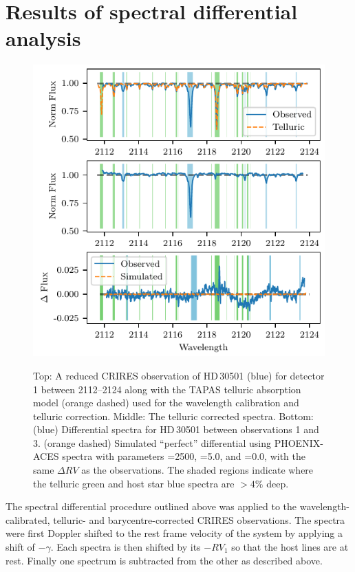 

\section{Results of spectral differential analysis}
\label{subsec:differential_results}

\begin{figure}
    \centering
    \includegraphics[width=0.8\hsize]{figures/direct-recovery/differential.pdf}\\
    \caption[Example of the spectral differential technique.]{Top: A reduced {CRIRES} observation of {HD\,30501} (blue) for detector 1 between 2112--2124\nm{} along with the {TAPAS} telluric absorption model ({orange} dashed) used for the wavelength calibration and telluric correction.
        Middle: The telluric corrected spectra.
        Bottom: ({blue}) Differential spectra for {HD\,30501} between observations 1 and 3.
        ({orange} dashed) Simulated ``perfect'' differential using {PHOENIX-ACES} spectra with parameters \Teff{}=2500\K{}, \Logg{}=5.0, and \feh{}=0.0, with the same \(\Delta {RV}\) as the observations.
        The shaded regions indicate where the telluric {green} and host star {blue} spectra are \(> 4\%\) deep.}
    \label{fig:spectral_example}
\end{figure}


The spectral differential procedure outlined above was applied to the wavelength-calibrated, telluric- and barycentre-corrected {CRIRES} observations.
The spectra were first Doppler shifted to the rest frame velocity of the system by applying a shift of \(-\gamma\).
Each spectra is then shifted by its $-{RV}_{1}$ so that the host lines are at rest.
Finally one spectrum is subtracted from the other as described above.

